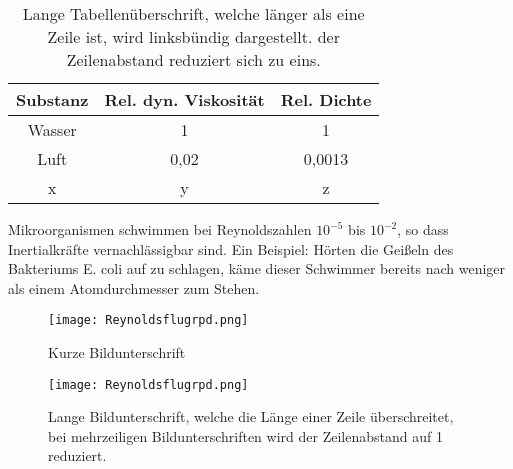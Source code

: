 \begin{table}[htbp]
\caption{Lange Tabellenüberschrift, welche länger als eine Zeile ist, wird linksbündig dargestellt. der Zeilenabstand reduziert sich zu eins.}
	\label{tab:xyz2}
	\centering
	\footnotesize
	\sffamily
		\begin{tabular}{|c||c|c|}
		\hline
		Substanz			& 	  Rel. dyn. Viskosität				&		Rel. Dichte				\\ \hline \hline
		Wasser				&			1														&		1									\\ \hline
		Luft					&			0,02												&		0,0013						\\ \hline
		x							&			y														&   z									\\ \hline
		\end{tabular}
\end{table}

Mikroorganismen schwimmen bei Reynoldszahlen $10^{-5}$ bis $10^{-2}$, so dass Inertialkräfte vernachlässigbar sind. Ein Beispiel: Hörten die Geißeln des Bakteriums E. coli auf zu schlagen, käme dieser Schwimmer bereits nach weniger als einem Atomdurchmesser zum Stehen.
\begin{figure}[htbp]
	\centering
		\texttt{[image: Reynoldsflugrpd.png]}
	\caption{Kurze Bildunterschrift}
	\label{fig:Reynoldsflugrpd}
\end{figure}
\begin{figure}[htbp]
	\centering
		\texttt{[image: Reynoldsflugrpd.png]}
	\caption{Lange Bildunterschrift, welche die Länge einer Zeile überschreitet, bei mehrzeiligen Bildunterschriften wird der Zeilenabstand auf 1 reduziert.}
	\label{fig:Reynoldsflugrpd2}
\end{figure}
